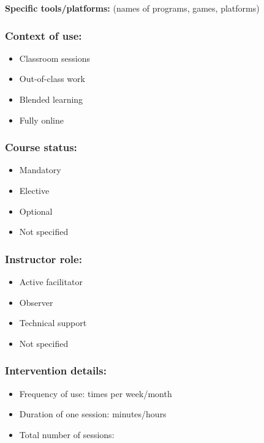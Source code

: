 \documentclass[
hf,
]{ceurart}
\begin{document}
\noindent\textbf{Specific tools/platforms:} (names of programs, games, platforms)\\
\underline{\hspace{\textwidth}}

\subsubsection*{Context of use:}
\begin{itemize}[label=$\square$]
    \item Classroom sessions
    \item Out-of-class work
    \item Blended learning
    \item Fully online
\end{itemize}

\subsubsection*{Course status:}
\begin{itemize}[label=$\square$]
    \item Mandatory
    \item Elective
    \item Optional
    \item Not specified
\end{itemize}

\subsubsection*{Instructor role:}
\begin{itemize}[label=$\square$]
    \item Active facilitator
    \item Observer
    \item Technical support
    \item Not specified
\end{itemize}

\subsubsection*{Intervention details:}
\begin{itemize}
    \item Frequency of use: \underline{\hspace{3cm}} times per week/month
    \item Duration of one session: \underline{\hspace{2cm}} minutes/hours
    \item Total number of sessions: \underline{\hspace{2cm}}
\end{itemize}
\end{document}
